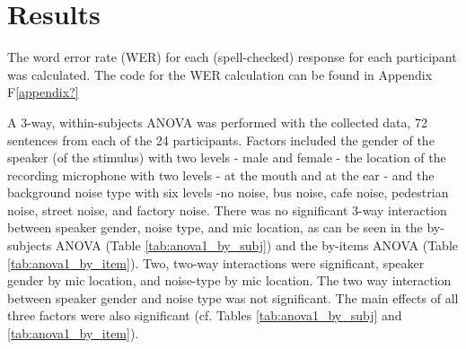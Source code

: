 \documentclass[dissertation,copyright]{uathesis}
\begin{document}
\section{Results}
\label{ch4:results}



The word error rate (WER) for each (spell-checked) response for each participant was calculated. The code for the WER calculation can be found in Appendix F\ref{appendix?}

A 3-way, within-subjects ANOVA was performed with the collected data, 72 sentences from each of the 24 participants. Factors included the gender of the speaker (of the stimulus) with two levels - male and female - the location of the recording microphone with two levels - at the mouth and at the ear - and the background noise type with six levels -no noise, bus noise, cafe noise, pedestrian noise, street noise, and factory noise.  There was no significant 3-way interaction between speaker gender, noise type, and mic location, as can be seen in the by-subjects ANOVA (Table \ref{tab:anova1_by_subj}) and the by-items ANOVA (Table \ref{tab:anova1_by_item}). Two, two-way interactions were significant, speaker gender by mic location, and noise-type by mic location. The two way interaction between speaker gender and noise type was not significant.  The main effects of all three factors were also significant (cf. Tables \ref{tab:anova1_by_subj} and \ref{tab:anova1_by_item}).
\end{document}
